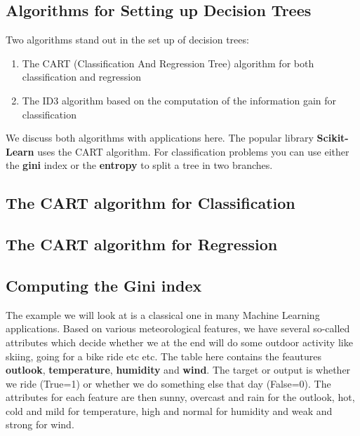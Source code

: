 \documentclass[%
oneside,                 %
final,                   %
10pt]{article}
\begin{document}
\subsection*{Algorithms for Setting up Decision Trees}

Two algorithms stand out in the set up of decision trees:
\begin{enumerate}
\item The CART (Classification And Regression Tree) algorithm for both classification and regression

\item The ID3 algorithm based on the computation of the information gain for classification
\end{enumerate}

\noindent
We discuss both algorithms with applications here. The popular library \textbf{Scikit-Learn} uses the CART algorithm. For classification problems you can use either the \textbf{gini} index or the \textbf{entropy} to split a tree in two branches.

\subsection*{The CART algorithm for Classification}


\subsection*{The CART algorithm for Regression}



\subsection*{Computing the Gini index}

The example we will look at is a classical one in many Machine
Learning applications. Based on various meteorological features, we
have several so-called attributes which decide whether we at the end
will do some outdoor activity like skiing, going for a bike ride etc
etc.  The table here contains the feautures \textbf{outlook}, \textbf{temperature},
\textbf{humidity} and \textbf{wind}.  The target or output is whether we ride
(True=1) or whether we do something else that day (False=0). The
attributes for each feature are then sunny, overcast and rain for the
outlook, hot, cold and mild for temperature, high and normal for
humidity and weak and strong for wind.
\end{document}

